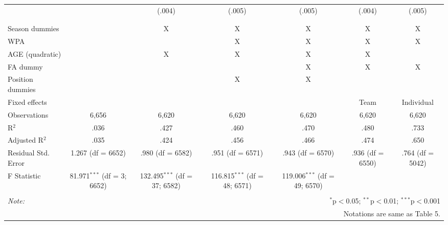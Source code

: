 \begin{table}[H]
\begin{tabular}{@{\extracolsep{5pt}}lcccccc}
  &  & (.004) & (.005) & (.005) & (.004) & (.005) \\
  & & & & & & \\
\hline \\[-1.8ex]
Season dummies &  & X & X & X & X & X \\
WPA & & & X & X & X & X  \\
AGE (quadratic) &  & X & X & X & X &  \\
FA dummy &  &  &  & X & X & X \\
Position dummies &  &  & X & X &  &  \\
Fixed effects &  &  &  &  & Team & Individual \\
Observations & 6,656 & 6,620 & 6,620 & 6,620 & 6,620 & 6,620 \\
R$^{2}$ & .036 & .427 & .460 & .470 & .480 & .733 \\
Adjusted R$^{2}$ & .035 & .424 & .456 & .466 & .474 & .650 \\
Residual Std. Error & 1.267 (df = 6652) & .980 (df = 6582) & .951 (df = 6571) & .943 (df = 6570) & .936 (df = 6550) & .764 (df = 5042) \\
F Statistic & 81.971$^{***}$ (df = 3; 6652) & 132.495$^{***}$ (df = 37; 6582) & 116.815$^{***}$ (df = 48; 6571) & 119.006$^{***}$ (df = 49; 6570) &  &  \\
\hline
\hline \\[-1.8ex]
\textit{Note:}  & \multicolumn{6}{r}{$^{*}$p$<$0.05; $^{**}$p$<$0.01; $^{***}$p$<$0.001} \\
& \multicolumn{6}{r}{Notations are same as Table 5.} \\
\end{tabular}
\end{table}

